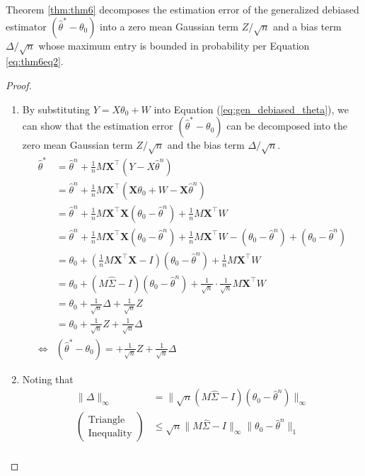 \documentclass{article}
\begin{document}
\noindent
Theorem \ref{thm:thm6} decomposes the estimation error of the generalized debiased estimator $(\hat{\theta}^*- \theta_0)$ into a zero mean Gaussian term $Z/\sqrt{n}$ and a bias term $\Delta/\sqrt{n}$ whose maximum entry is bounded in probability per Equation \ref{eq:thm6eq2}.
\begin{proof}
\leavevmode\par
\begin{enumerate}
\item By substituting $Y= X\theta_0 + W$ into Equation (\ref{eq:gen_debiased_theta}), we can show that the estimation error $(\hat{\theta}^* - \theta_0)$  can be decomposed into the zero mean Gaussian term $Z/\sqrt{n}$ and the bias term $\Delta/\sqrt{n}$. 
\begin{align*}
    \hat{\theta}^* &= \hat{\theta}^n + \frac{1}{n} M \mathbf{X}^\top(Y-X \hat{\theta}^n)\\
    &=\hat{\theta}^n + \frac{1}{n}M\mathbf{X}^\top(\mathbf{X} \theta_0 + W - \mathbf{X}\hat{\theta}^n)\\
    &= \hat{\theta}^n + \frac{1}{n}M\mathbf{X}^\top\mathbf{X}(\theta_0 - \hat{\theta}^n) + \frac{1}{n}M \mathbf{X}^\top W \\
    &= \hat{\theta}^n + \frac{1}{n}M\mathbf{X}^\top\mathbf{X}(\theta_0 -\hat{\theta}^n) + \frac{1}{n}M\mathbf{X}^\top W - (\theta_0 - \hat{\theta}^n) + (\theta_0 - \hat{\theta}^n) \\
    &=\theta_0 + \left(\frac{1}{n}M\mathbf{X}^\top \mathbf{X} - I\right)(\theta_0 - \hat{\theta}^n) + \frac{1}{n}M \mathbf{X}^\top W\\
    &= \theta_0 + (M\hat{\Sigma}-I)(\theta_0 - \hat{\theta}^n) + \frac{1}{\sqrt{n}}\cdot\frac{1}{\sqrt{n}}M\mathbf{X}^\top W\\
    &=\theta_0 + \frac{1}{\sqrt{n}}\Delta + \frac{1}{\sqrt{n}}Z \\
    &=\theta_0 + \frac{1}{\sqrt{n}}Z + \frac{1}{\sqrt{n}}\Delta\\
    \iff& (\hat{\theta}^* - \theta_0) = + \frac{1}{\sqrt{n}}Z + \frac{1}{\sqrt{n}}\Delta
\end{align*}
\item Noting that  
\begin{align*}
\|\Delta\|_\infty &= \|\sqrt{n}(M\hat{\Sigma} - I)(\theta_0 - \hat{\theta}^n)\|_\infty\\
(\substack{\text{Triangle}\\\text{Inequality}})&\le\sqrt{n}\|M\hat{\Sigma}-I\|_\infty \|\theta_0 - \hat{\theta}^n\|_1 \\

\end{align*}
\end{enumerate}
\end{proof}
\end{document}
